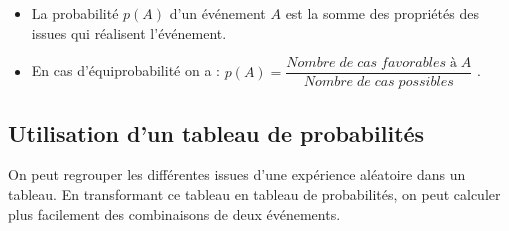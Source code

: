 \documentclass[12pt,a4paper]{article}
\begin{document}
	\begin{myprops}
		\begin{itemize}
			\item La probabilité $p(A)$ d'un événement $A$ est la somme des propriétés des issues qui réalisent l'événement.
			\item En cas d'équiprobabilité on a : $p(A) = \dfrac{Nombre\;de\; cas\; favorables\; à\; A}{Nombre\; de\; cas\; possibles}$ .
		\end{itemize}
		
	\end{myprops}
	
	
	
	
	
	
	



\subsection{Utilisation d'un tableau de probabilités}


\begin{mymeth}
	On peut regrouper les différentes issues d'une expérience aléatoire dans un tableau.
	En transformant ce tableau en tableau de probabilités, on peut calculer plus facilement des combinaisons de deux événements.
\end{mymeth}
\end{document}
